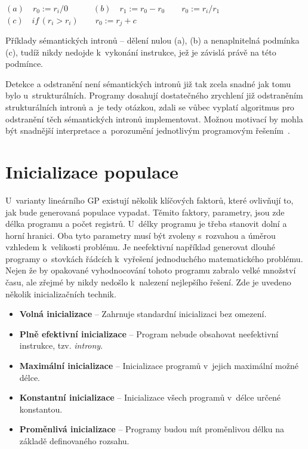 \begin{center}
$(a) \quad r_0 := r_i/0 
  \quad  \quad  \quad (b) \quad r_1 := r_0 - r_0 
\quad \quad r_0 := r_i/r_1 $ \\ 
\vspace{0.6cm}
$ (c) \quad if \, (r_i > r_i) 
\quad \quad r_0 := r_j + c $   \\
\vspace{0.6cm}

Příklady sémantických intronů -- dělení nulou (a), (b) a nenaplnitelná podmínka (c), tudíž nikdy nedojde k~vykonání instrukce, jež je závislá právě na této podmínce.
\end{center}
\vspace{0.3cm}

Detekce a odstranění není sémantických intronů již tak zcela snadné jak tomu bylo u~strukturálních. Programy dosahují dostatečného zrychlení již odstraněním  strukturálních intronů a~je tedy otázkou, zdali se vůbec vyplatí algoritmus pro odstranění těch sémantických intronů implementovat. Možnou motivací by mohla být snadnější interpretace a~porozumění jednotlivým programovým řešením~\cite[str. 44]{LGP}.

\section{Inicializace populace}
 U~varianty lineárního GP existují několik klíčových faktorů, které ovlivňují to, jak bude generovaná populace vypadat. Těmito faktory, parametry, jsou 
 zde délka programu a počet registrů. U~délky programu je třeba stanovit dolní a horní hranici. Oba tyto parametry musí být zvoleny s~rozvahou a úměrou vzhledem k~velikosti problému. Je neefektivní například generovat dlouhé programy o~stovkách řádcích k~vyřešení jednoduchého matematického problému. Nejen že by opakované vyhodnocování tohoto programu zabralo velké množství času, ale zřejmé by nikdy nedošlo k~nalezení nejlepšího řešení.
Zde je uvedeno několik inicializačních technik. 
\begin{itemize}
    \item \textbf{Volná inicializace} -- Zahrnuje standardní inicializaci bez omezení.
    \item \textbf{Plně efektivní inicializace} -- Program nebude obsahovat neefektivní instrukce,  tzv. \emph{introny}.
    \item \textbf{Maximální inicializace} -- Inicializace programů v~jejich maximální možné délce.
    \item \textbf{Konstantní inicializace} -- Inicializace všech programů v~délce určené konstantou.
    \item \textbf{Proměnlivá inicializace} -- Programy budou mít proměnlivou délku na základě definovaného rozsahu.
\end{itemize}

